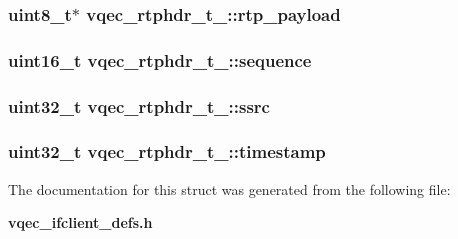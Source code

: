 \subsubsection{\setlength{\rightskip}{0pt plus 5cm}uint8\_\-t$\ast$ \bf{vqec\_\-rtphdr\_\-t\_\-::rtp\_\-payload}}\label{structvqec__rtphdr__t___12435fba9aa92c30365530dbb76dcc52}


\subsubsection{\setlength{\rightskip}{0pt plus 5cm}uint16\_\-t \bf{vqec\_\-rtphdr\_\-t\_\-::sequence}}\label{structvqec__rtphdr__t___6025066715191c84816f6255ed44da64}


\subsubsection{\setlength{\rightskip}{0pt plus 5cm}uint32\_\-t \bf{vqec\_\-rtphdr\_\-t\_\-::ssrc}}\label{structvqec__rtphdr__t___5bcc5b9ef0d2875ea672770f31fc3f87}


\subsubsection{\setlength{\rightskip}{0pt plus 5cm}uint32\_\-t \bf{vqec\_\-rtphdr\_\-t\_\-::timestamp}}\label{structvqec__rtphdr__t___05b285f83330193021494ba14a627199}




The documentation for this struct was generated from the following file:\begin{CompactItemize}
\item 
\bf{vqec\_\-ifclient\_\-defs.h}\end{CompactItemize}
